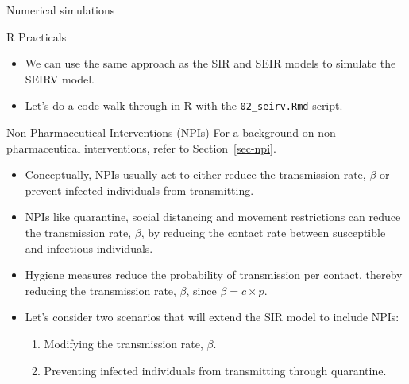 \documentclass[
  ignorenonframetext,
]{beamer}
\providecommand{\tightlist}{%
  \setlength{\itemsep}{0pt}\setlength{\parskip}{0pt}}\usepackage{longtable,booktabs,array}
\begin{document}
\begin{frame}[fragile]
\begin{block}{Numerical simulations}
\label{numerical-simulations-2}
\begin{block}{R Practicals}
\label{r-practicals-1}
\begin{itemize}
\item
  We can use the same approach as the SIR and SEIR models to simulate
  the SEIRV model.
\item
  Let's do a code walk through in R with the \texttt{02\_seirv.Rmd}
  script.
\end{itemize}

\end{block}
\end{block}
\end{frame}

\begin{frame}
\begin{block}{Non-Pharmaceutical Interventions (NPIs)}
\label{non-pharmaceutical-interventions-npis}
For a background on non-pharmaceutical interventions, refer to
Section~\ref{sec-npi}.
\end{block}
\end{frame}

\begin{frame}
\begin{itemize}
\item
  Conceptually, NPIs usually act to either reduce the transmission rate,
  \(\beta\) or prevent infected individuals from transmitting.
\item
  NPIs like quarantine, social distancing and movement restrictions can
  reduce the transmission rate, \(\beta\), by reducing the contact rate
  between susceptible and infectious individuals.
\item
  Hygiene measures reduce the probability of transmission per contact,
  thereby reducing the transmission rate, \(\beta\), since
  \(\beta = c \times p\).
\end{itemize}
\end{frame}

\begin{frame}
\begin{itemize}
\item
  Let's consider two scenarios that will extend the SIR model to include
  NPIs:

  \begin{enumerate}
  \tightlist
  \item
    Modifying the transmission rate, \(\beta\).
  \item
    Preventing infected individuals from transmitting through
    quarantine.
  \end{enumerate}
\end{itemize}
\end{frame}
\end{document}
